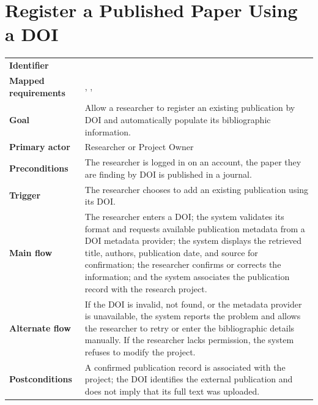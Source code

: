 \section{Register a Published Paper Using a DOI}
\begin{tabularx}{\linewidth}{L{3.5cm}Y}
\toprule
\textbf{Identifier} & \\
\textbf{Mapped requirements} & , , \\
\textbf{Goal} & Allow a researcher to register an existing publication by DOI and automatically populate its bibliographic information.\\
\textbf{Primary actor} & Researcher or Project Owner\\
\textbf{Preconditions} & The researcher is logged in on an account, the paper they are finding by DOI is published in a journal.\\
\textbf{Trigger} & The researcher chooses to add an existing publication using its DOI.\\
\textbf{Main flow} & The researcher enters a DOI; the system validates its format and requests available publication metadata from a DOI metadata provider; the system displays the retrieved title, authors, publication date, and source for confirmation; the researcher confirms or corrects the information; and the system associates the publication record with the research project.\\
\textbf{Alternate flow} & If the DOI is invalid, not found, or the metadata provider is unavailable, the system reports the problem and allows the researcher to retry or enter the bibliographic details manually. If the researcher lacks permission, the system refuses to modify the project.\\
\textbf{Postconditions} & A confirmed publication record is associated with the project; the DOI identifies the external publication and does not imply that its full text was uploaded.\\
\bottomrule
\end{tabularx}


